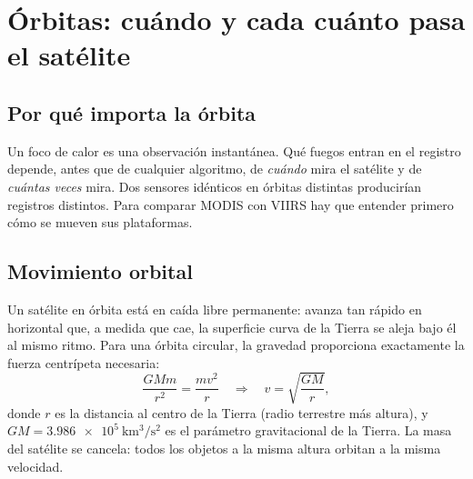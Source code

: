 \chapter{Órbitas: cuándo y cada cuánto pasa el satélite}\label{cap:orbitas}


\section{Por qué importa la órbita}

Un foco de calor es una observación instantánea. Qué fuegos entran en el registro depende, antes
que de cualquier algoritmo, de \emph{cuándo} mira el satélite y de \emph{cuántas veces} mira. Dos
sensores idénticos en órbitas distintas producirían registros distintos. Para comparar MODIS con
VIIRS hay que entender primero cómo se mueven sus plataformas.

\section{Movimiento orbital}

Un satélite en órbita está en caída libre permanente: avanza tan rápido en horizontal que, a
medida que cae, la superficie curva de la Tierra se aleja bajo él al mismo ritmo. Para una
órbita circular, la gravedad proporciona exactamente la fuerza centrípeta necesaria:
\begin{equation}
  \frac{G M m}{r^2} = \frac{m v^2}{r}
  \quad\Longrightarrow\quad
  v = \sqrt{\frac{GM}{r}},
\end{equation}
donde $r$ es la distancia al centro de la Tierra (radio terrestre más altura), y $GM =
\SI{3.986e5}{\kilo\metre\cubed\per\second\squared}$ es el parámetro gravitacional de la Tierra.
La masa del satélite se cancela: todos los objetos a la misma altura orbitan a la misma
velocidad.

